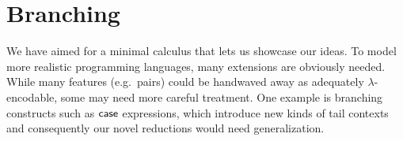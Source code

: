 \documentclass[a4paper, 11pt,titlepage, openright, twoside]{report}
\newcommand{\keyword}[1]{\textsf{\textup{#1}}}
\newcommand{\KwHandle}{\keyword{handle}}
\newcommand{\Handle}{\KwHandle\;}
\newcommand{\KwWith}{\keyword{with}}
\newcommand{\With}{\;\KwWith\;}
\newcommand{\Letrec}[3]{\keyword{letrec}\:#1\:\keyword{=}\:#2\:\keyword{in}\:#3}
\newcommand{\+}{\enspace}
\begin{document}

\section{Branching}
We have aimed for a minimal calculus that lets us showcase our ideas.
To model more realistic programming languages,
many extensions are obviously needed.
While many features (e.g.\  pairs)
could be handwaved away as adequately $λ$-encodable,
some may need more careful treatment.
One example is branching constructs such as $\keyword{case}$ expressions,
which introduce new kinds of tail contexts
and consequently our novel reductions would need generalization.

\printbibliography[heading=bibintoc]
\end{document}
